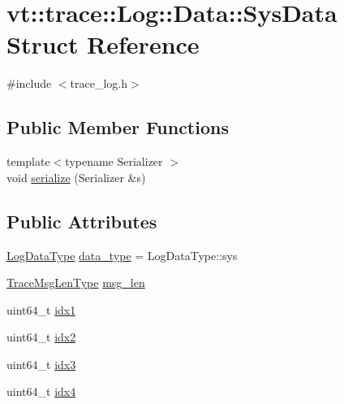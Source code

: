 \hypertarget{structvt_1_1trace_1_1_log_1_1_data_1_1_sys_data}{}\section{vt\+:\+:trace\+:\+:Log\+:\+:Data\+:\+:Sys\+Data Struct Reference}
\label{structvt_1_1trace_1_1_log_1_1_data_1_1_sys_data}


{\ttfamily \#include $<$trace\+\_\+log.\+h$>$}

\subsection*{Public Member Functions}
\begin{DoxyCompactItemize}
\item 
{\footnotesize template$<$typename Serializer $>$ }\\void \hyperlink{structvt_1_1trace_1_1_log_1_1_data_1_1_sys_data_a6cd52cce20f1f31fd8bb7aa84471a606}{serialize} (Serializer \&s)
\end{DoxyCompactItemize}
\subsection*{Public Attributes}
\begin{DoxyCompactItemize}
\item 
\hyperlink{structvt_1_1trace_1_1_log_ae1c08093fd18967b7d4912d04d6acc3d}{Log\+Data\+Type} \hyperlink{structvt_1_1trace_1_1_log_1_1_data_1_1_sys_data_abf36342ab6f92372bf13cf35be7bbb25}{data\+\_\+type} = Log\+Data\+Type\+::sys
\item 
\hyperlink{namespacevt_1_1trace_aeb598f45d67d41db7902e494f2f0ce59}{Trace\+Msg\+Len\+Type} \hyperlink{structvt_1_1trace_1_1_log_1_1_data_1_1_sys_data_a514d2e0977e4acf99920ed45a910ae0a}{msg\+\_\+len}
\item 
uint64\+\_\+t \hyperlink{structvt_1_1trace_1_1_log_1_1_data_1_1_sys_data_a446ec2588d49845c97e4485695943041}{idx1}
\item 
uint64\+\_\+t \hyperlink{structvt_1_1trace_1_1_log_1_1_data_1_1_sys_data_a5df5c2a04facacefdb450e4d228ab8bb}{idx2}
\item 
uint64\+\_\+t \hyperlink{structvt_1_1trace_1_1_log_1_1_data_1_1_sys_data_ab7d9be6fe4d8eb35a832a33f17eaff70}{idx3}
\item 
uint64\+\_\+t \hyperlink{structvt_1_1trace_1_1_log_1_1_data_1_1_sys_data_a7676b739d24eef60c98bf040aa631898}{idx4}
\end{DoxyCompactItemize}
